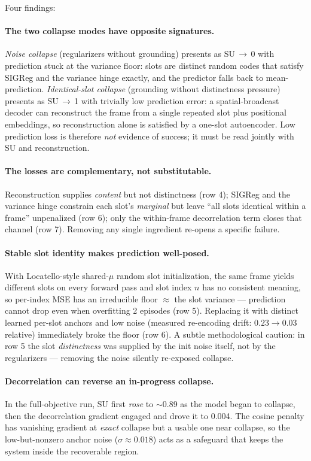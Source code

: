 \documentclass[12pt]{article}
\begin{document}
Four findings:

\paragraph{The two collapse modes have opposite signatures.} \emph{Noise collapse} (regularizers without grounding) presents as SU\,$\rightarrow$\,0 with prediction stuck at the variance floor: slots are distinct random codes that satisfy SIGReg and the variance hinge exactly, and the predictor falls back to mean-prediction. \emph{Identical-slot collapse} (grounding without distinctness pressure) presents as SU\,$\rightarrow$\,1 with trivially low prediction error: a spatial-broadcast decoder can reconstruct the frame from a single repeated slot plus positional embeddings, so reconstruction alone is satisfied by a one-slot autoencoder. Low prediction loss is therefore \emph{not} evidence of success; it must be read jointly with SU and reconstruction.

\paragraph{The losses are complementary, not substitutable.} Reconstruction supplies \emph{content} but not distinctness (row 4); SIGReg and the variance hinge constrain each slot's \emph{marginal} but leave ``all slots identical within a frame'' unpenalized (row 6); only the within-frame decorrelation term closes that channel (row 7). Removing any single ingredient re-opens a specific failure.

\paragraph{Stable slot identity makes prediction well-posed.} With Locatello-style shared-$\mu$ random slot initialization, the same frame yields different slots on every forward pass and slot index $n$ has no consistent meaning, so per-index MSE has an irreducible floor $\approx$ the slot variance --- prediction cannot drop even when overfitting 2 episodes (row 5). Replacing it with distinct learned per-slot anchors and low noise (measured re-encoding drift: $0.23 \rightarrow 0.03$ relative) immediately broke the floor (row 6). A subtle methodological caution: in row 5 the slot \emph{distinctness} was supplied by the init noise itself, not by the regularizers --- removing the noise silently re-exposed collapse.

\paragraph{Decorrelation can reverse an in-progress collapse.} In the full-objective run, SU first \emph{rose} to $\sim$0.89 as the model began to collapse, then the decorrelation gradient engaged and drove it to 0.004. The cosine penalty has vanishing gradient at \emph{exact} collapse but a usable one near collapse, so the low-but-nonzero anchor noise ($\sigma \approx 0.018$) acts as a safeguard that keeps the system inside the recoverable region.
\end{document}
